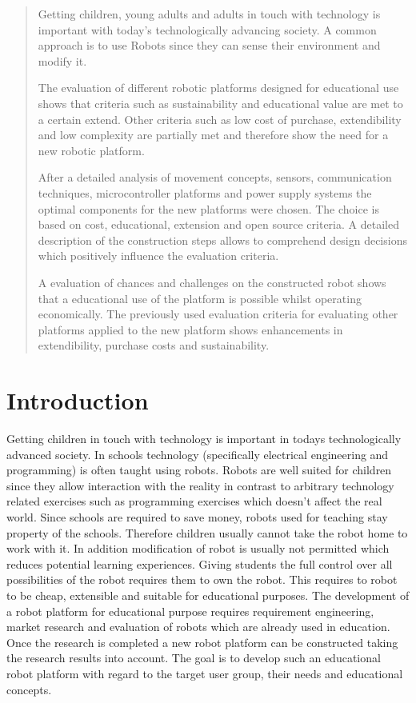 \documentclass[11pt,a4paper]{article}
\begin{document}
\begin{abstract}
Getting children, young adults and adults in touch with technology is important with today’s technologically advancing society. A common approach is to use Robots since they can sense their environment and modify it. 

The evaluation of different robotic platforms designed for educational use shows that criteria such as sustainability and educational value are met to a certain extend. Other criteria such as low cost of purchase, extendibility and low complexity are partially met and therefore show the need for a new robotic platform.

After a detailed analysis of movement concepts, sensors, communication techniques, microcontroller platforms and power supply systems the optimal components for the new  platforms were chosen. The choice is based on cost, educational, extension and open source criteria. A detailed description of the construction steps allows to comprehend design decisions which positively influence the evaluation criteria.

A evaluation of chances and challenges on the constructed robot shows that a educational use of the platform is possible whilst operating economically. The previously used evaluation criteria for evaluating other platforms applied to the new platform shows enhancements in extendibility, purchase costs and sustainability.
\end{abstract}


\section{Introduction}
Getting children in touch with technology is important in todays technologically advanced society. In schools technology (specifically electrical engineering and programming) is often taught using robots. Robots are well suited for children since they allow interaction with the reality in contrast to arbitrary technology related exercises such as programming exercises which doesn't affect the real world.\newline 
Since schools are required to save money, robots used for teaching stay property of the schools. Therefore children usually cannot take the robot home to work with it. In addition modification of robot is usually not permitted which reduces potential learning experiences. Giving students the full control over all possibilities of the robot requires them to own the robot. This requires to robot to be cheap, extensible and suitable for educational purposes.\newline
The development of a robot platform for educational purpose requires requirement engineering, market research and evaluation of robots which are already used in education. Once the research is completed a new robot platform can be constructed taking the research results into account. The goal is to develop such an educational robot platform with regard to the target user group, their needs and educational concepts.
\end{document}
